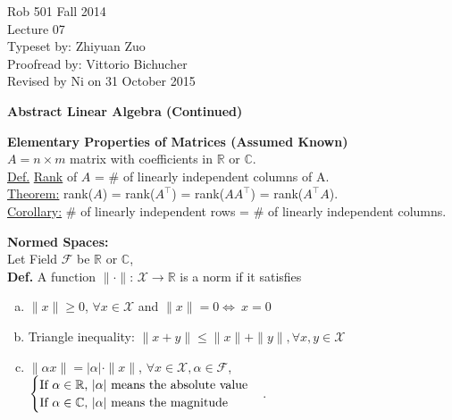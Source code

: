\documentclass[letterpaper]{article}
\begin{document}
\baselineskip=48pt  %


\setlength{\parskip}{.3in}
\setlength{\itemsep}{.3in}

\pagestyle{plain}

{\Large \bf
\begin{center}
Rob 501 Fall 2014\\
Lecture 07\\
Typeset by:  Zhiyuan Zuo\\
Proofread by: Vittorio Bichucher\\
Revised by Ni on 31 October 2015
\end{center}
}

\Large

\begin{center}
\textbf{Abstract Linear Algebra (Continued)}
\end{center}

\noindent \textbf{Elementary Properties of Matrices (Assumed Known)}\\
    $A = n\times m$ matrix with coefficients in $\mathbb{R} $ or   $\mathbb{C} $.\\
    \noindent \underline{Def.} \underline{Rank} of $A$ = $\#$ of linearly independent columns of A. \\
    \noindent \underline{Theorem:} rank($A$) = rank($A^\top $) = rank($AA^\top $) = rank($A^\top A$). \\
    \noindent \underline{Corollary:} $\#$ of linearly independent rows  = $\#$ of linearly independent columns.

\noindent \textbf{Normed Spaces:}\\
    Let Field $\mathcal{F} $ be $\mathbb{R} $ or $\mathbb{C} $,  \\
    \noindent \textbf{Def.} A function $\| \cdot \|$: $\mathcal{X} \to\mathbb{R} $ is a norm if it satisfies
    \vspace{-5mm}
    \begin{enumerate}[(a)]
        \item $\| x \| \ge 0$, $\forall x \in \mathcal{X}$ and $\| x \| = 0 \Leftrightarrow \ x = 0$
        \item Triangle inequality: $\| x+y \| \le \|x\| + \|y\|, \forall x, y \in \mathcal{X}$
        \item $\| \alpha x\| = |\alpha| \cdot \|x\|$, $\forall x\in \mathcal{X}, \alpha \in \mathcal{F}$,
            $
            \begin{cases}
                \textnormal{If } \alpha \in \mathbb{R}\textnormal{, } |\alpha| \textnormal{ means the absolute value}\\
                \textnormal{If } \alpha \in \mathbb{C}\textnormal{, } |\alpha| \textnormal{ means the magnitude}
            \end{cases}
            $.
    \end{enumerate}
\end{document}
